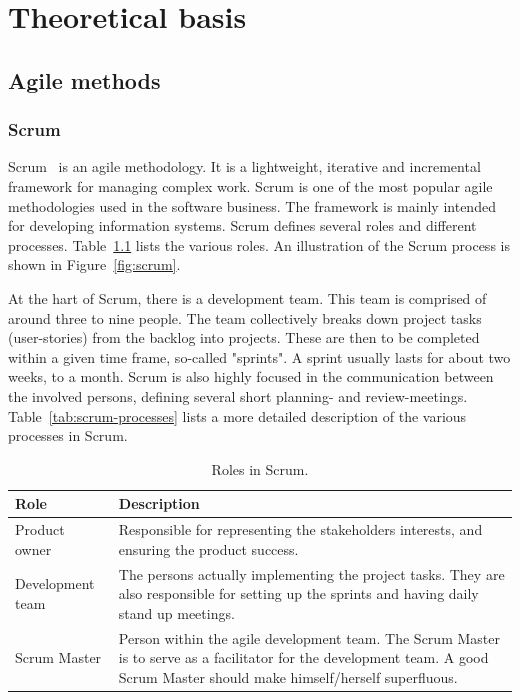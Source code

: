 \chapter{Theoretical basis}

\section{Agile methods}
\subsection{Scrum}
\label{sec:theory-scrum}
Scrum~\cite{scrum} is an agile methodology. It is a lightweight, iterative and incremental framework for managing complex work. Scrum is one of the most popular agile methodologies used in the software business. The framework is mainly intended for developing information systems. Scrum defines several roles and different processes. Table~\ref{tab:scrum-roles} lists the various roles. An illustration of the Scrum process is shown in Figure~\ref{fig:scrum}.

At the hart of Scrum, there is a development team. This team is comprised of around three to nine people. The team collectively breaks down project tasks (user-stories) from the backlog into projects. These are then to be completed within a given time frame, so-called "sprints". A sprint usually lasts for about two weeks, to a month. Scrum is also highly focused in the communication between the involved persons, defining several short planning- and review-meetings. Table~\ref{tab:scrum-processes} lists a more detailed description of the various processes in Scrum. 

\begin{table}[H]
    \centering
    \caption{Roles in Scrum.}
    \label{tab:scrum-roles}
    \begin{tabularx}{\textwidth}{|l|X|}
        \hline
        \textbf{Role} & \textbf{Description}\\
        \hline
        Product owner & Responsible for representing the stakeholders interests, and ensuring the product success.\\
        \hline
        Development team & The persons actually implementing the project tasks. They are also responsible for setting up the sprints and having daily stand up meetings.\\
        \hline
        Scrum Master & Person within the agile development team. The Scrum Master is to serve as a facilitator for the development team. A good Scrum Master should make himself/herself superfluous.\\
        \hline
    \end{tabularx}
\end{table}

